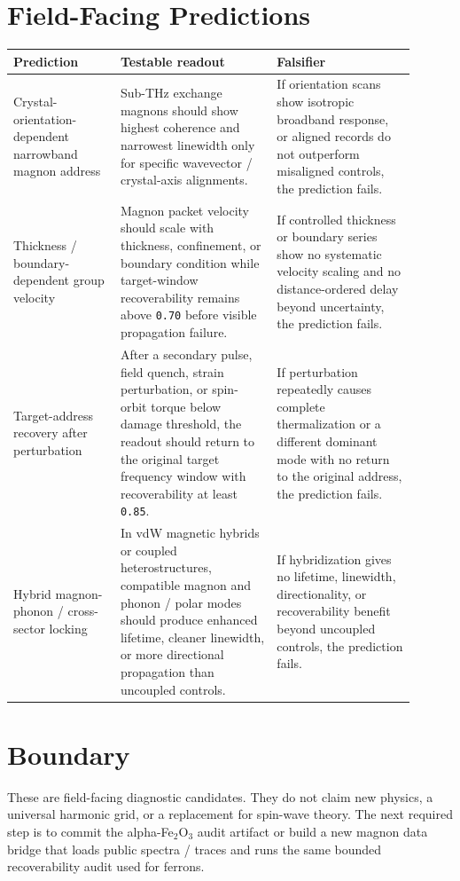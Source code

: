 \documentclass[11pt]{article}
\begin{document}
\section*{Field-Facing Predictions}

\begin{center}
\begin{tabular}{p{0.24\linewidth}p{0.35\linewidth}p{0.31\linewidth}}
\toprule
Prediction & Testable readout & Falsifier \\
\midrule
Crystal-orientation-dependent narrowband magnon address &
Sub-THz exchange magnons should show highest coherence and narrowest linewidth
only for specific wavevector / crystal-axis alignments. &
If orientation scans show isotropic broadband response, or aligned records do
not outperform misaligned controls, the prediction fails. \\
\addlinespace
Thickness / boundary-dependent group velocity &
Magnon packet velocity should scale with thickness, confinement, or boundary
condition while target-window recoverability remains above \texttt{0.70} before
visible propagation failure. &
If controlled thickness or boundary series show no systematic velocity scaling
and no distance-ordered delay beyond uncertainty, the prediction fails. \\
\addlinespace
Target-address recovery after perturbation &
After a secondary pulse, field quench, strain perturbation, or spin-orbit torque
below damage threshold, the readout should return to the original target
frequency window with recoverability at least \texttt{0.85}. &
If perturbation repeatedly causes complete thermalization or a different
dominant mode with no return to the original address, the prediction fails. \\
\addlinespace
Hybrid magnon-phonon / cross-sector locking &
In vdW magnetic hybrids or coupled heterostructures, compatible magnon and
phonon / polar modes should produce enhanced lifetime, cleaner linewidth, or
more directional propagation than uncoupled controls. &
If hybridization gives no lifetime, linewidth, directionality, or recoverability
benefit beyond uncoupled controls, the prediction fails. \\
\bottomrule
\end{tabular}
\end{center}

\section*{Boundary}

These are field-facing diagnostic candidates. They do not claim new physics, a
universal harmonic grid, or a replacement for spin-wave theory. The next
required step is to commit the alpha-Fe$_2$O$_3$ audit artifact or build a new
magnon data bridge that loads public spectra / traces and runs the same bounded
recoverability audit used for ferrons.
\end{document}
